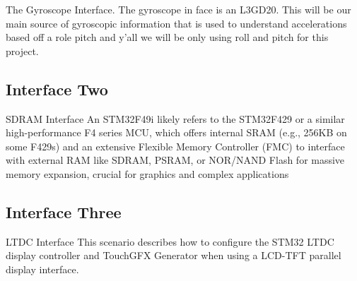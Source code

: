 The Gyroscope Interface.  
The gyroscope in face is an L3GD20. This will be our main source of gyroscopic information that is used to understand accelerations based off a role pitch and y'all we will be only using roll and pitch for this project.
\subsection{Interface Two}
\label{loc:InterfaceTwo}
% 

SDRAM Interface
An STM32F49i likely refers to the STM32F429 or a similar high-performance F4 series MCU, which offers internal SRAM (e.g., 256KB on some F429s) and an extensive Flexible Memory Controller (FMC) to interface with external RAM like SDRAM, PSRAM, or NOR/NAND Flash for massive memory expansion, crucial for graphics and complex applications

\subsection{Interface Three}
\label{loc:InterfaceTwo}
% 

LTDC Interface
This scenario describes how to configure the STM32 LTDC display controller and TouchGFX Generator when using a LCD-TFT parallel display interface.